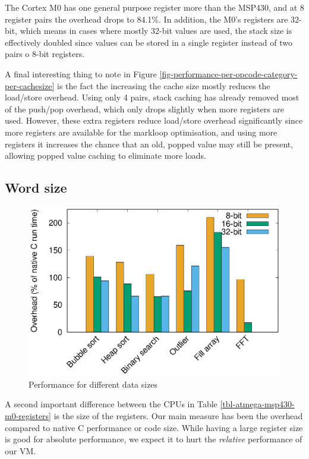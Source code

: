 The Cortex M0 has one general purpose register more than the MSP430, and at 8 register pairs the overhead drops to 84.1\%. In addition, the M0's registers are 32-bit, which means in cases where mostly 32-bit values are used, the stack size is effectively doubled since values can be stored in a single register instead of two pairs o 8-bit registers.

A final interesting thing to note in Figure \ref{fig-performance-per-opcode-category-per-cachesize} is the fact the increasing the cache size mostly reduces the load/store overhead. Using only 4 pairs, stack caching has already removed most of the push/pop overhead, which only drops slightly when more registers are used. However, these extra registers reduce load/store overhead significantly since more registers are available for the markloop optimisation, and using more registers it increases the chance that an old, popped value may still be present, allowing popped value caching to eliminate more loads.

\subsection{Word size}
\label{sec-evaluation-other-platforms-word-size}
\begin{figure}
    \centering
    \includegraphics[width=\myfiguresizeperformance]{8_16_32_bit.eps}
    \caption{Performance for different data sizes}
    \label{fig-performance-8-16-32-bit}
\end{figure}



A second important difference between the CPUs in Table \ref{tbl-atmega-msp430-m0-registers} is the size of the registers. Our main measure has been the overhead compared to native C performance or code size. While having a large register size is good for absolute performance, we expect it to hurt the \emph{relative} performance of our VM.

